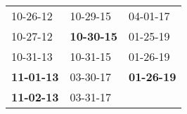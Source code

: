 \begin{supertabular}{p{0.33\columnwidth}p{0.33\columnwidth}p{0.33\columnwidth}}
          10-26-12\textsuperscript{} &           10-29-15\textsuperscript{} &           04-01-17\textsuperscript{} \\
          10-27-12\textsuperscript{} &  \textbf{10-30-15\textsuperscript{}} &           01-25-19\textsuperscript{} \\
          10-31-13\textsuperscript{} &           10-31-15\textsuperscript{} &           01-26-19\textsuperscript{} \\
 \textbf{11-01-13\textsuperscript{}} &           03-30-17\textsuperscript{} &  \textbf{01-26-19\textsuperscript{}} \\
 \textbf{11-02-13\textsuperscript{}} &           03-31-17\textsuperscript{} &                                      \\
\end{supertabular}
